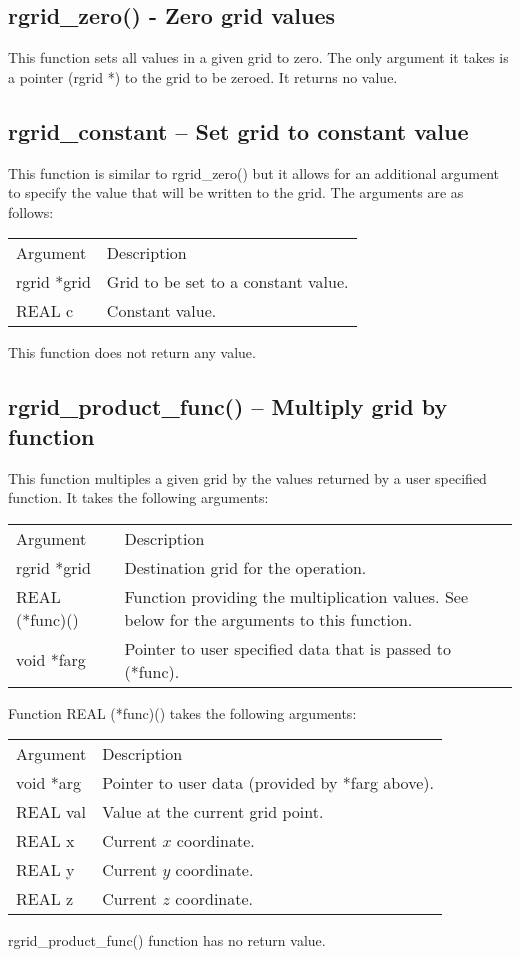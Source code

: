 \documentclass[12pt,letterpaper]{report}
\begin{document}
\subsection{rgrid\_zero() - Zero grid values}

This function sets all values in a given grid to zero. The only argument it takes is a pointer (rgrid *) to the grid to be zeroed. It returns no value.

\subsection{rgrid\_constant -- Set grid to constant value}

This function is similar to rgrid\_zero() but it allows for an additional argument to specify the value that will be written to the grid. The arguments are as follows:
\begin{longtable}{p{} p{}}
Argument & Description\\
\cline{1-2}
rgrid *grid & Grid to be set to a constant value.\\
REAL c & Constant value.
\end{longtable}
\noindent
This function does not return any value.

\subsection{rgrid\_product\_func() -- Multiply grid by function}

This function multiples a given grid by the values returned by a user specified function. It takes the following arguments:
\begin{longtable}{p{} p{}}
Argument & Description\\
\cline{1-2}
rgrid *grid & Destination grid for the operation.\\
REAL (*func)() & Function providing the multiplication values. See below for the arguments to this function.\\
void *farg & Pointer to user specified data that is passed to (*func).\\   
\end{longtable}
\noindent
Function REAL (*func)() takes the following arguments:
\begin{longtable}{p{} p{}}
Argument & Description\\
\cline{1-2}
void *arg & Pointer to user data (provided by *farg above).\\
REAL val & Value at the current grid point.\\
REAL x & Current $x$ coordinate.\\
REAL y & Current $y$ coordinate.\\
REAL z & Current $z$ coordinate.\\
\end{longtable}
\noindent
rgrid\_product\_func() function has no return value.
\end{document}
